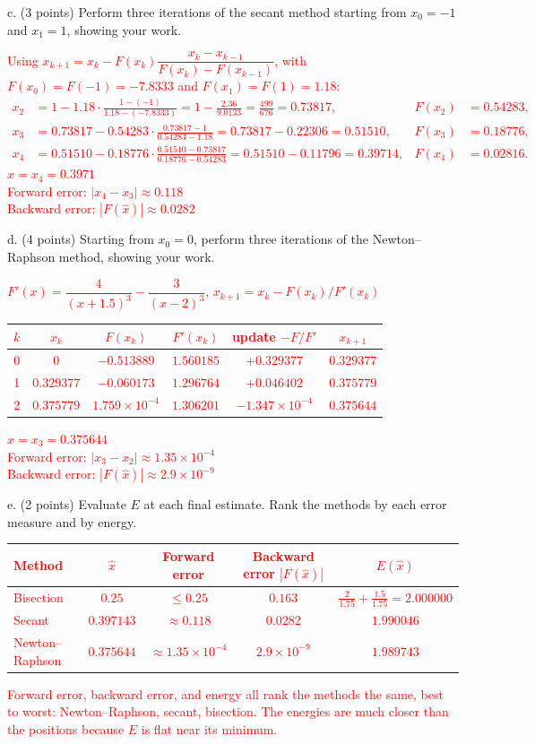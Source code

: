 \documentclass[11pt]{article}
\begin{document}
c. (3 points) Perform three iterations of the secant method starting from $x_0=-1$ and
$x_1=1$, showing your work.

\textcolor{red}{
Using $x_{k+1} = x_k - F(x_k)\dfrac{x_k - x_{k-1}}{F(x_k) - F(x_{k-1})}$, with $F(x_0) = F(-1) = -7.8333$ and $F(x_1) = F(1) = 1.18$:
\begin{align*}
x_2 &= 1 - 1.18\cdot\frac{1 - (-1)}{1.18 - (-7.8333)} = 1 - \frac{2.36}{9.0133} = \frac{499}{676} = 0.73817, & F(x_2) &= 0.54283, \\
x_3 &= 0.73817 - 0.54283\cdot\frac{0.73817 - 1}{0.54283 - 1.18} = 0.73817 - 0.22306 = 0.51510, & F(x_3) &= 0.18776, \\
x_4 &= 0.51510 - 0.18776\cdot\frac{0.51510 - 0.73817}{0.18776 - 0.54283} = 0.51510 - 0.11796 = 0.39714, & F(x_4) &= 0.02816.
\end{align*}
$\hat x = x_4 = 0.3971$\\
Forward error: $|x_4 - x_3| \approx 0.118$\\
Backward error: $|F(\hat x)| \approx 0.0282$
}

d. (4 points) Starting from $x_0=0$, perform three iterations of the Newton--Raphson method,
showing your work.

\textcolor{red}{
$F'(x) = \dfrac{4}{(x+1.5)^3} - \dfrac{3}{(x-2)^3}$, $x_{k+1} = x_k - F(x_k)/F'(x_k)$
\begin{center}
\begin{tabular}{cccccc}
$k$ & $x_k$ & $F(x_k)$ & $F'(x_k)$ & update $-F/F'$ & $x_{k+1}$ \\ \hline
0 & $0$ & $-0.513889$ & $1.560185$ & $+0.329377$ & $0.329377$ \\
1 & $0.329377$ & $-0.060173$ & $1.296764$ & $+0.046402$ & $0.375779$ \\
2 & $0.375779$ & $1.759\times10^{-4}$ & $1.306201$ & $-1.347\times10^{-4}$ & $0.375644$
\end{tabular}
\end{center}
$\hat x = x_3 = 0.375644$\\
Forward error: $|x_3 - x_2| \approx 1.35\times10^{-4}$\\
Backward error: $|F(\hat x)| \approx 2.9\times10^{-9}$
}

e. (2 points) Evaluate $E$ at each final estimate. Rank the methods by each error measure
and by energy.

\textcolor{red}{
\begin{center}
\begin{tabular}{lcccc}
Method & $\hat x$ & Forward error & Backward error $|F(\hat x)|$ & $E(\hat x)$ \\ \hline
Bisection & $0.25$ & $\le 0.25$ & $0.163$ & $\tfrac{2}{1.75} + \tfrac{1.5}{1.75} = 2.000000$ \\
Secant & $0.397143$ & $\approx 0.118$ & $0.0282$ & $1.990046$ \\
Newton--Raphson & $0.375644$ & $\approx 1.35\times10^{-4}$ & $2.9\times10^{-9}$ & $1.989743$
\end{tabular}
\end{center}
Forward error, backward error, and energy all rank the methods the same, best to worst: Newton--Raphson, secant, bisection. The energies are much closer than the positions because $E$ is flat near its minimum.
}
\end{document}
